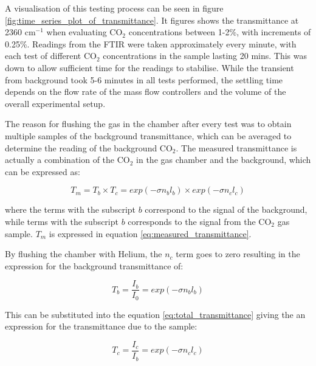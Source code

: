 A visualisation of this testing process can be seen in figure \ref{fig:time_series_plot_of_transmittance}. It figures shows the transmittance at 2360 cm$^{-1}$ when evaluating CO$_2$ concentrations between 1-2\%, with increments of 0.25\%. Readings from the FTIR were taken approximately every minute, with each test of different CO$_2$ concentrations in the sample lasting 20 mins. This was down to allow sufficient time for the readings to stabilise. While the transient from background took 5-6 minutes in all tests performed, the settling time depends on the flow rate of the mass flow controllers and the volume of the overall experimental setup. 

The reason for flushing the gas in the chamber after every test was to obtain multiple samples of the background transmittance, which can be averaged to determine the reading of the background CO$_2$. The measured transmittance is actually a combination of the CO$_2$ in the gas chamber and the background, which can be expressed as:

\begin{equation}
    T_m = T_b \times T_c = exp(-\sigma n_b l_b) \times exp(-\sigma n_c l_c)
        \label{eq:total_transmittance}
\end{equation}

where the terms with the subscript $b$ correspond to the signal of the background, while terms with the subscript $b$ corresponds to the signal from the CO$_2$ gas sample. $T_m$ is expressed in equation \ref{eq:measured_transmittance}.

By flushing the chamber with Helium, the $n_c$ term goes to zero resulting in the expression for the background transmittance of:

\begin{equation}
    T_b = \frac{I_b}{I_0} = exp(-\sigma n_b l_b)
\end{equation}

This can be substituted into the equation \ref{eq:total_transmittance} giving the an expression for the transmittance due to the sample:

\begin{equation}
    T_c = \frac{I_c}{I_b} = exp(-\sigma n_c l_c)
    \label{eq:sample_transmittance}
\end{equation}

